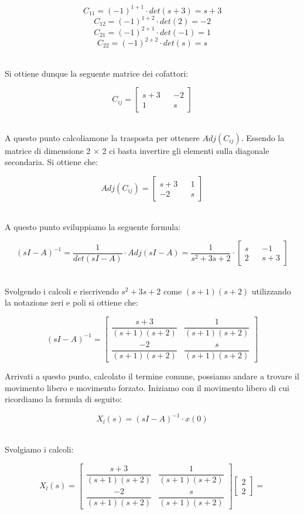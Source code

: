 \documentclass[../main.tex]{subfiles}
\begin{document}
\[ C_{11} = (-1)^{1+1} \cdot \unit{det}(s+3) = s + 3\]
\[ C_{12} = (-1)^{1+2} \cdot \unit{det}(2) = -2\]
\[ C_{21} = (-1)^{2+1} \cdot \unit{det}(-1) = 1\]
\[ C_{22} = (-1)^{2+2} \cdot \unit{det}(s) = s\]\

Si ottiene dunque la seguente matrice dei cofattori:

\[ C_{ij} = \begin{bmatrix} s+3 && -2 \\ 1 && s \end{bmatrix}\]\

A questo punto calcoliamone la trasposta per ottenere $\unit{Adj}(C_{ij})$. Essendo la matrice di dimensione 2 $\times$ 2 ci basta invertire gli elementi sulla diagonale secondaria. Si ottiene che:

\[ \unit{Adj}(C_{ij}) = \begin{bmatrix} s+3 && 1 \\ -2 && s \end{bmatrix} \]\

A questo punto sviluppiamo la seguente formula:

\[ (sI-A)^{-1} = \frac{1}{\unit{det}(sI-A)} \cdot \unit{Adj}(sI-A) = \frac{1}{s^2 + 3s + 2} \cdot \begin{bmatrix} s && - 1 \\ 2 && s + 3 \end{bmatrix} \]\

Svolgendo i calcoli e  riscrivendo $s^2 + 3s + 2$ come $(s+1)(s+2)$ utilizzando la notazione zeri e poli si ottiene che:

\[ (sI - A)^{-1} =
\begin{bmatrix}
\dfrac{s+3}{(s+1)(s+2)} & \dfrac{1}{(s+1)(s+2)} \\[1em]
\dfrac{-2}{(s+1)(s+2)} & \dfrac{s}{(s+1)(s+2)}
\end{bmatrix} \]

Arrivati a questo punto, calcolato il termine comune, possiamo andare a trovare il movimento libero e movimento forzato.
Iniziamo con il movimento libero di cui ricordiamo la formula di seguito:

\[X_{l}(s) = (sI - A)^{-1} \cdot x(0) \]\

Svolgiamo i calcoli:

\[ X_{l}(s) = 
\begin{bmatrix}
\dfrac{s+3}{(s+1)(s+2)} & \dfrac{1}{(s+1)(s+2)} \\[1em]
\dfrac{-2}{(s+1)(s+2)} & \dfrac{s}{(s+1)(s+2)}
\end{bmatrix} \begin{bmatrix} 2 \\ 2 \end{bmatrix} = \]\
\end{document}
